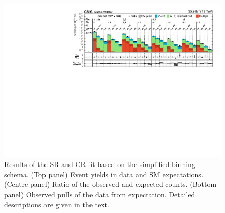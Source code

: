 \begin{figure}[h!]
  \centering
  \includegraphics[width=0.95\linewidth]{Supplementary/SimplifiedBinning_results_full-fit-bg_aux} 
  \caption{Results of the SR and CR fit based on the simplified binning
    schema. (Top panel) Event yields in data and SM
    expectations. (Centre panel) Ratio of the observed and expected
    counts. (Bottom panel) Observed pulls of the data from
    expectation. Detailed descriptions are given in the text.
  }
  \label{fig:aggregated_results}
\end{figure}

